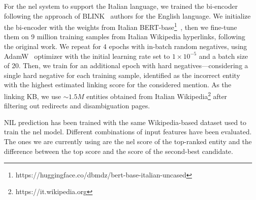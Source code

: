 For the \ac{nel} system to support the Italian language, we trained the bi-encoder following the approach of BLINK~\cite{blink} authors for the English language. We initialize the bi-encoder with the weights from Italian BERT-base\footnote{https://huggingface.co/dbmdz/bert-base-italian-uncased}~\cite{stefan_schweter_2020_4263142}, then we fine-tune them on 9 million training samples from Italian Wikipedia hyperlinks, following the original work. We repeat for 4 epochs with in-batch random negatives, using AdamW~\cite{loshchilov2018decoupled} optimizer with the initial learning rate set to $1 \times 10^{-5}$ and a batch size of 20. Then, we train for an additional epoch with hard negatives---considering a single hard negative for each training sample, identified as the incorrect entity with the highest estimated linking score for the considered mention.
As the linking KB, we use $\sim1.5M$ entities obtained from Italian Wikipedia\footnote{https://it.wikipedia.org} after filtering out redirects and disambiguation pages. 






NIL prediction has been trained with the same Wikipedia-based dataset used to train the \ac{nel} model. Different combinations of input features have been evaluated. The ones we are currently using are the \ac{nel} score of the top-ranked entity and the difference between the top score and the score of the second-best candidate.

